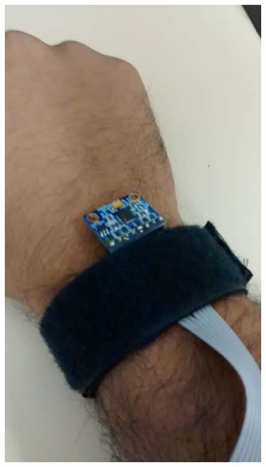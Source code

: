 	 	\begin{figure}[h!]
	 		\centering
	 		\includegraphics[keepaspectratio=true,scale=0.1]{figuras/prototipo_2_2.jpg}

\end{figure}
